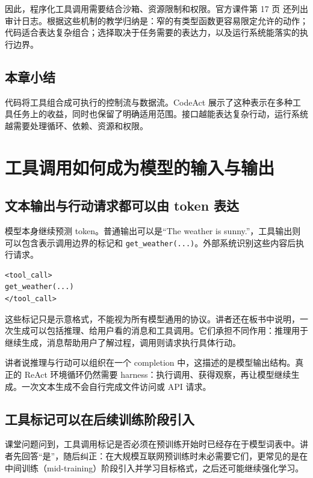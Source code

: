 \documentclass[11pt,a4paper]{article}
\begin{document}
因此，程序化工具调用需要结合沙箱、资源限制和权限。官方课件第 17 页 还列出审计日志。根据这些机制的教学归纳是：窄的有类型函数更容易限定允许的动作；代码适合表达复杂组合；选择取决于任务需要的表达力，以及运行系统能落实的执行边界。

\subsection{本章小结}
代码将工具组合成可执行的控制流与数据流。CodeAct 展示了这种表示在多种工具任务上的收益，同时也保留了明确适用范围。接口越能表达复杂行动，运行系统越需要处理循环、依赖、资源和权限。

\clearpage
\section{工具调用如何成为模型的输入与输出}
\subsection{文本输出与行动请求都可以由 token 表达}
模型本身继续预测 token。普通输出可以是“The weather is sunny.”，工具输出则可以包含表示调用边界的标记和 \texttt{get\_weather(...)}。外部系统识别这些内容后执行请求。

\noindent\begin{minipage}{\textwidth}
\begin{lstlisting}[language={},caption={课程工具输出示意：调用标记表达请求边界}]
<tool_call>
get_weather(...)
</tool_call>
\end{lstlisting}
\end{minipage}

这些标记只是示意格式，不能视为所有模型通用的协议。讲者还在板书中说明，一次生成可以包括推理、给用户看的消息和工具调用。它们承担不同作用：推理用于继续生成，消息帮助用户了解过程，调用则请求执行具体行动。

讲者说推理与行动可以组织在一个 completion 中，这描述的是模型输出结构。真正的 ReAct 环境循环仍然需要 harness：执行调用、获得观察，再让模型继续生成。一次文本生成不会自行完成文件访问或 API 请求。

\subsection{工具标记可以在后续训练阶段引入}
课堂问题问到，工具调用标记是否必须在预训练开始时已经存在于模型词表中。讲者先回答“是”，随后纠正：在大规模互联网预训练时未必需要它们，更常见的是在中间训练（mid-training）阶段引入并学习目标格式，之后还可能继续强化学习。
\end{document}
